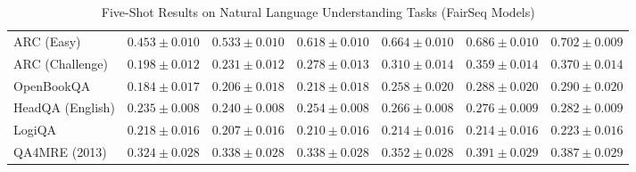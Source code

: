 \documentclass[11pt]{article}
\begin{document}
{\begin{landscape}
\begin{table}
\begin{tabular}{l c c c c c c }
ARC (Easy) & $0.453 \pm 0.010$ & $0.533 \pm 0.010$ & $0.618 \pm 0.010$ & $0.664 \pm 0.010$ & $0.686 \pm 0.010$ & $0.702 \pm 0.009$ \\ 
ARC (Challenge) & $0.198 \pm 0.012$ & $0.231 \pm 0.012$ & $0.278 \pm 0.013$ & $0.310 \pm 0.014$ & $0.359 \pm 0.014$ & $0.370 \pm 0.014$ \\ 
OpenBookQA & $0.184 \pm 0.017$ & $0.206 \pm 0.018$ & $0.218 \pm 0.018$ & $0.258 \pm 0.020$ & $0.288 \pm 0.020$ & $0.290 \pm 0.020$ \\ 
HeadQA (English) & $0.235 \pm 0.008$ & $0.240 \pm 0.008$ & $0.254 \pm 0.008$ & $0.266 \pm 0.008$ & $0.276 \pm 0.009$ & $0.282 \pm 0.009$ \\ 
LogiQA & $0.218 \pm 0.016$ & $0.207 \pm 0.016$ & $0.210 \pm 0.016$ & $0.214 \pm 0.016$ & $0.214 \pm 0.016$ & $0.223 \pm 0.016$ \\ 
QA4MRE (2013) & $0.324 \pm 0.028$ & $0.338 \pm 0.028$ & $0.338 \pm 0.028$ & $0.352 \pm 0.028$ & $0.391 \pm 0.029$ & $0.387 \pm 0.029$ \\ 
\bottomrule 
\end{tabular}
\caption{Five-Shot Results on Natural Language Understanding Tasks (FairSeq Models)}
\label{tab:nlu_fairseq_5}
\end{table}


\end{landscape}}
\end{document}
